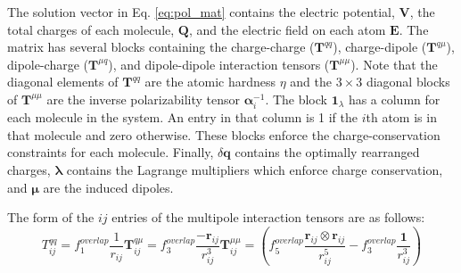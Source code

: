 \documentclass[journal=jacsat,manuscript=article]{achemso}
\begin{document}
The solution vector in Eq. \ref{eq:pol_mat} contains the electric potential,
$\bm{V}$, the total charges of each molecule, $\bm{Q}$, and the electric
field on each atom $\bm{E}$. The matrix has several blocks containing the
charge-charge ($\bm{T}^{qq}$), charge-dipole ($\bm{T}^{q\mu}$),
dipole-charge ($\bm{T}^{\mu q}$), and dipole-dipole interaction tensors ($\bm{T}^{\mu\mu}$).
Note that the diagonal elements of $\bm{T}^{qq}$ are the atomic hardness $\eta$ and
the $3\times 3$ diagonal blocks of $\bm{T}^{\mu\mu}$ are the inverse polarizability tensor
$\bm{\alpha}_i^{-1}$. The block $\bm{1}_\lambda$ has a column for each molecule in the system.
An entry in that column is 1 if the $i$th atom is in that molecule and zero otherwise.
These blocks enforce the charge-conservation constraints for each molecule.
Finally, $\delta\bm{q}$ contains the optimally rearranged charges, $\bm{\lambda}$ contains
the Lagrange multipliers which enforce charge conservation, and $\bm{\mu}$ are the induced dipoles.

The form of the $ij$ entries of the multipole interaction tensors are as follows:
\begin{subequations}
  \begin{equation}
    T^{qq}_{ij}=f_1^{overlap}\frac{1}{r_{ij}}
    \label{eq:tensors_a}
  \end{equation}
  \begin{equation}
  \bm{T}^{q\mu}_{ij}=f_3^{overlap}\frac{-\bm{r}_{ij}}{r_{ij}^3}
    \label{eq:tensors_b}
  \end{equation}
  \begin{equation}
  \bm{T}^{\mu\mu}_{ij}=\left(f_5^{overlap}\frac{\bm{r}_{ij}\otimes\bm{r}_{ij}}{r_{ij}^5}-f_3^{overlap}\frac{\bm{1}}{r_{ij}^3}\right)
    \label{eq:tensors_c}
  \end{equation}
  \label{eq:tensors}
\end{subequations}
\end{document}
